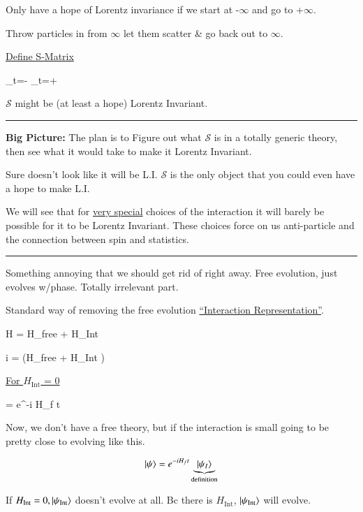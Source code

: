 {Only have a hope of Lorentz invariance if we start at -$\infty$ and go to +$\infty$.

Throw particles in from $\infty$ let them scatter \& go back out to $\infty$.

\underline{Define S-Matrix}

\be
{}_{t=-\infty} \rightarrow {}_{t=+\infty}
\ee

$\mathcal{S}$ might be (at least a hope) Lorentz Invariant.

\noindent\rule{\textwidth}{1pt}

\textbf{Big Picture:}
The plan is to Figure out what $\mathcal{S}$ is in a totally generic theory, then see what it would take to make it Lorentz Invariant. 

Sure doesn't look like it will be L.I. 
$\mathcal{S}$ is the only object that you could even have a hope to make L.I.

We will see that for \underline{very special} choices of the interaction it will barely be possible for it to be Lorentz Invariant. 
These choices force on us anti-particle and the connection between spin and statistics. 

\noindent\rule{\textwidth}{1pt}

Something annoying that we should get rid of right away. 
Free evolution, just evolves w/phase. Totally irrelevant part.


Standard way of removing the free evolution \underline{``Interaction Representation''}.

\be
H = H_\textrm{free} + H_\textrm{Int}
\ee


\be
i  = \left(H_\textrm{free} + H_\textrm{Int} \right) \ket{\psi} 
\ee

\underline{For $H_\textrm{Int}$ = 0}

\be
\ket{\psi} = e^{-i H_f t} 
\ee

Now, we don't have a free theory, but if the interaction is small going to be pretty close to evolving like this. 


\begin{equation}\label{eq:def}
\ket{\psi} = e^{-i H_f t} \underbrace{\ket{\psi_{I}}}_{\textrm{definition}}
\end{equation}

If $H_\textrm{Int} = 0, \ket{\psi_\textrm{Int}}$ doesn't evolve at all.
Bc there is $H_\textrm{Int}$, $\ket{\psi_\textrm{Int}}$ will evolve. 

}
